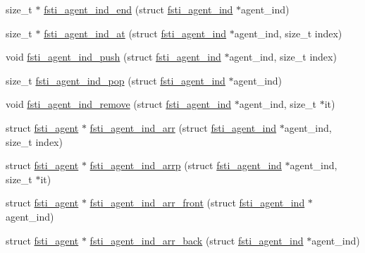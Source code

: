 \begin{DoxyCompactItemize}
\item 
size\+\_\+t $\ast$ \mbox{\hyperlink{fsti-agent_8h_a0a007fca1a85b26dc9f890b5c9f5649a}{fsti\+\_\+agent\+\_\+ind\+\_\+end}} (struct \mbox{\hyperlink{structfsti__agent__ind}{fsti\+\_\+agent\+\_\+ind}} $\ast$agent\+\_\+ind)
\item 
size\+\_\+t $\ast$ \mbox{\hyperlink{fsti-agent_8h_a4c099994dc5a8cedc1de073fa64bfbcc}{fsti\+\_\+agent\+\_\+ind\+\_\+at}} (struct \mbox{\hyperlink{structfsti__agent__ind}{fsti\+\_\+agent\+\_\+ind}} $\ast$agent\+\_\+ind, size\+\_\+t index)
\item 
void \mbox{\hyperlink{fsti-agent_8h_aeb0ffefe572b09e4e3d8e33571e256da}{fsti\+\_\+agent\+\_\+ind\+\_\+push}} (struct \mbox{\hyperlink{structfsti__agent__ind}{fsti\+\_\+agent\+\_\+ind}} $\ast$agent\+\_\+ind, size\+\_\+t index)
\item 
size\+\_\+t \mbox{\hyperlink{fsti-agent_8h_a40bb88f7ef7f1adc5b3bf76964f5ce03}{fsti\+\_\+agent\+\_\+ind\+\_\+pop}} (struct \mbox{\hyperlink{structfsti__agent__ind}{fsti\+\_\+agent\+\_\+ind}} $\ast$agent\+\_\+ind)
\item 
void \mbox{\hyperlink{fsti-agent_8h_a9005e4c20f02aff3ad90dafbaa630583}{fsti\+\_\+agent\+\_\+ind\+\_\+remove}} (struct \mbox{\hyperlink{structfsti__agent__ind}{fsti\+\_\+agent\+\_\+ind}} $\ast$agent\+\_\+ind, size\+\_\+t $\ast$it)
\item 
struct \mbox{\hyperlink{structfsti__agent}{fsti\+\_\+agent}} $\ast$ \mbox{\hyperlink{fsti-agent_8h_a0e45e82b7f4f019b1813daf04717b894}{fsti\+\_\+agent\+\_\+ind\+\_\+arr}} (struct \mbox{\hyperlink{structfsti__agent__ind}{fsti\+\_\+agent\+\_\+ind}} $\ast$agent\+\_\+ind, size\+\_\+t index)
\item 
struct \mbox{\hyperlink{structfsti__agent}{fsti\+\_\+agent}} $\ast$ \mbox{\hyperlink{fsti-agent_8h_a0d3fcfadb1159b63508be133b30f8df7}{fsti\+\_\+agent\+\_\+ind\+\_\+arrp}} (struct \mbox{\hyperlink{structfsti__agent__ind}{fsti\+\_\+agent\+\_\+ind}} $\ast$agent\+\_\+ind, size\+\_\+t $\ast$it)
\item 
struct \mbox{\hyperlink{structfsti__agent}{fsti\+\_\+agent}} $\ast$ \mbox{\hyperlink{fsti-agent_8h_ade2459f6fc82794b3fe9bca7585bdfa1}{fsti\+\_\+agent\+\_\+ind\+\_\+arr\+\_\+front}} (struct \mbox{\hyperlink{structfsti__agent__ind}{fsti\+\_\+agent\+\_\+ind}} $\ast$agent\+\_\+ind)
\item 
struct \mbox{\hyperlink{structfsti__agent}{fsti\+\_\+agent}} $\ast$ \mbox{\hyperlink{fsti-agent_8h_aac56f2d510cd312bdb5b32a221e00309}{fsti\+\_\+agent\+\_\+ind\+\_\+arr\+\_\+back}} (struct \mbox{\hyperlink{structfsti__agent__ind}{fsti\+\_\+agent\+\_\+ind}} $\ast$agent\+\_\+ind)

\end{DoxyCompactItemize}
